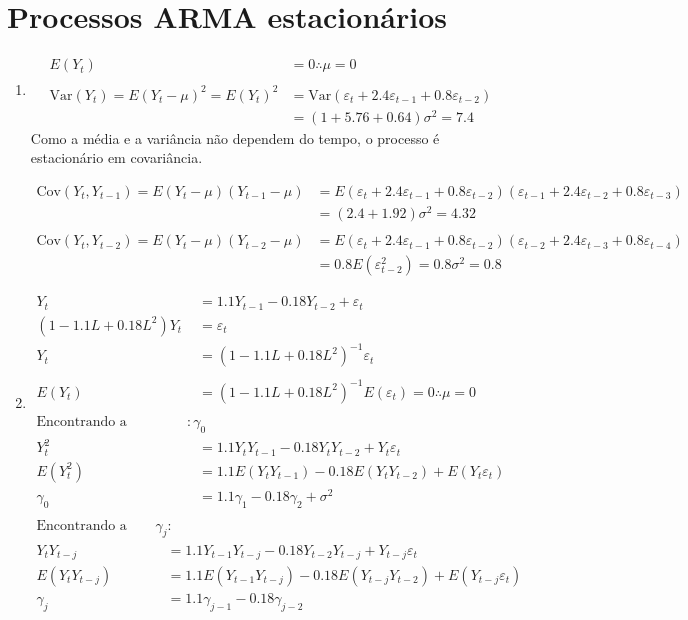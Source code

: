 \setcounter{chapter}{2}
\chapter{Processos ARMA estacionários}

\begin{enumerate}
	\item[\fbox{3.1}]
		\begin{align*}
		E(Y_t)&=0 \therefore \mu=0\\
		\\
		\text{Var}(Y_t)=E(Y_t-\mu)^2=E(Y_t)^2&=\text{Var}(\varepsilon_t+2.4\varepsilon_{t-1}+0.8\varepsilon_{t-2})\\
		&=(1+5.76+0.64)\sigma^2=7.4
		\end{align*}
		Como a média e a variância não dependem do tempo, o processo é estacionário em covariância.
		
		\begin{align*}
		\text{Cov}(Y_t,Y_{t-1})=E(Y_t-\mu)(Y_{t-1}-\mu)&=E(\varepsilon_t+2.4\varepsilon_{t-1}+0.8\varepsilon_{t-2})(\varepsilon_{t-1}+2.4\varepsilon_{t-2}+0.8\varepsilon_{t-3})\\
		&=(2.4+1.92)\sigma^2=4.32\\
		\\
		\text{Cov}(Y_t,Y_{t-2})=E(Y_t-\mu)(Y_{t-2}-\mu)&=E(\varepsilon_t+2.4\varepsilon_{t-1}+0.8\varepsilon_{t-2})(\varepsilon_{t-2}+2.4\varepsilon_{t-3}+0.8\varepsilon_{t-4})\\
		&=0.8E(\varepsilon_{t-2}^2)=0.8\sigma^2=0.8
		\end{align*}
		
		\item[\fbox{3.2}]
		\begin{align*}
			Y_t&=1.1Y_{t-1}-0.18Y_{t-2}+\varepsilon_t\\
			(1-1.1L+0.18L^2)Y_t&=\varepsilon_t\\
			Y_t&=(1-1.1L+0.18L^2)^{-1}\varepsilon_t\\
			\\
			E(Y_t)&=(1-1.1L+0.18L^2)^{-1}E(\varepsilon_t)=0 \therefore \mu=0\\
			\\
			\text{Encontrando a variância }:\gamma_0\\
			Y_t^2&=1.1Y_tY_{t-1}-0.18Y_tY_{t-2}+Y_t\varepsilon_t\\
			E(Y_t^2)&=1.1E(Y_tY_{t-1})-0.18E(Y_tY_{t-2})+E(Y_t\varepsilon_t)\\
			\gamma_0&=1.1\gamma_1-0.18\gamma_2+\sigma^2\\
		\end{align*}
		\begin{align*}
			\text{Encontrando a autocovariância } \gamma_j:\\
			Y_tY_{t-j}&=1.1Y_{t-1}Y_{t-j}-0.18Y_{t-2}Y_{t-j}+Y_{t-j}\varepsilon_t\\
			E(Y_tY_{t-j})&=1.1E(Y_{t-1}Y_{t-j})-0.18E(Y_{t-j}Y_{t-2})+E(Y_{t-j}\varepsilon_t)\\
			\gamma_j&=1.1\gamma_{j-1}-0.18\gamma_{j-2}\\
		\end{align*}
		

\end{enumerate}
